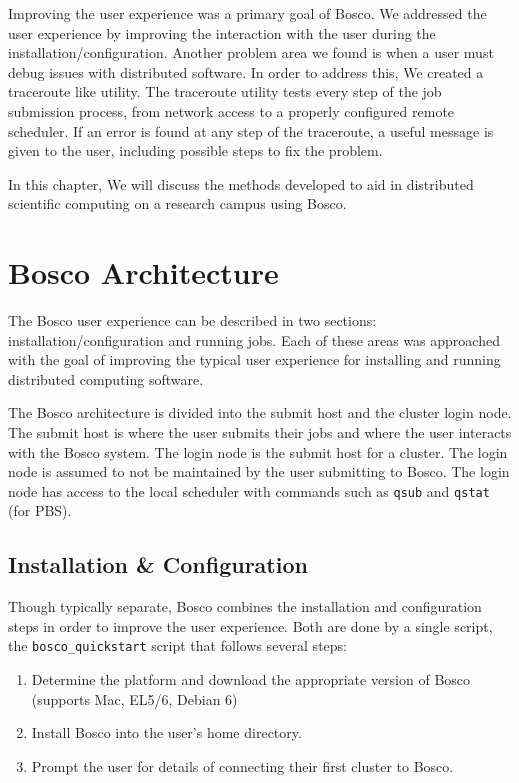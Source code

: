 Improving the user experience was a primary goal of Bosco.  We addressed the user experience by improving the interaction with the user during the installation/configuration.  Another problem area we found is when a user must debug issues with distributed software.  In order to address this, We created a traceroute \cite{mao2003towards} like utility.  The traceroute utility tests every step of the job submission process, from network access to a properly configured remote scheduler.  If an error is found at any step of the traceroute, a useful message is given to the user, including possible steps to fix the problem.




In this chapter, We will discuss the methods developed to aid in distributed scientific computing on a research campus using Bosco.  

\section{Bosco Architecture}
\label{sec:boscoarch}

% 

The Bosco user experience can be described in two sections: installation/configuration and running jobs.  Each of these areas was approached with the goal of improving the typical user experience for installing and running distributed computing software.

The Bosco architecture is divided into the submit host and the cluster login node.  The submit host is where the user submits their jobs and where the user interacts with the Bosco system.  The login node is the submit host for a cluster.  The login node is assumed to not be maintained by the user submitting to Bosco.  The login node has access to the local scheduler with commands such as \texttt{qsub} and \texttt{qstat} (for PBS). 

\subsection{Installation \& Configuration}
Though typically separate, Bosco combines the installation and configuration steps in order to improve the user experience.  Both are done by a single script, the \texttt{bosco\_quickstart} script that follows several steps:

\begin{enumerate}
\item Determine the platform and download the appropriate version of Bosco (supports Mac, EL5/6, Debian 6)
\item Install Bosco into the user's home directory.
\item Prompt the user for details of connecting their first cluster to Bosco.
\end{enumerate}

